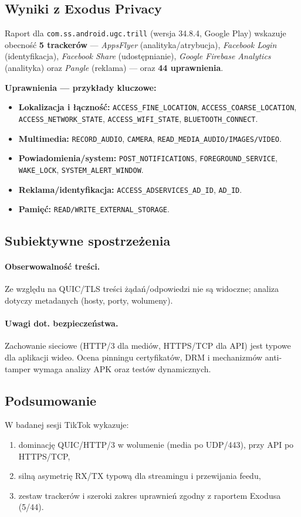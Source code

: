 \subsection{Wyniki z Exodus Privacy \cite{ExodusPrivacy}}
Raport dla \texttt{com.ss.android.ugc.trill} (wersja 34.8.4, Google Play) wskazuje obecność \textbf{5 trackerów} — \emph{AppsFlyer} (analityka/atrybucja), \emph{Facebook Login} (identyfikacja), \emph{Facebook Share} (udostępnianie), \emph{Google Firebase Analytics} (analityka) oraz \emph{Pangle} (reklama) — oraz \textbf{44 uprawnienia}.

\textbf{Uprawnienia — przykłady kluczowe:}
\begin{itemize}
  \item \textbf{Lokalizacja i łączność:} \texttt{ACCESS\_FINE\_LOCATION}, \texttt{ACCESS\_COARSE\_LOCATION}, \texttt{ACCESS\_NETWORK\_STATE}, \texttt{ACCESS\_WIFI\_STATE}, \texttt{BLUETOOTH\_CONNECT}.
  \item \textbf{Multimedia:} \texttt{RECORD\_AUDIO}, \texttt{CAMERA}, \texttt{READ\_MEDIA\_AUDIO/IMAGES/VIDEO}.
  \item \textbf{Powiadomienia/system:} \texttt{POST\_NOTIFICATIONS}, \texttt{FOREGROUND\_SERVICE}, \texttt{WAKE\_LOCK}, \texttt{SYSTEM\_ALERT\_WINDOW}.
  \item \textbf{Reklama/identyfikacja:} \texttt{ACCESS\_ADSERVICES\_AD\_ID}, \texttt{AD\_ID}.
  \item \textbf{Pamięć:} \texttt{READ/WRITE\_EXTERNAL\_STORAGE}.
\end{itemize}

\subsection{Subiektywne spostrzeżenia}
\paragraph{Obserwowalność treści.} 
Ze względu na QUIC/TLS treści żądań/odpowiedzi nie są widoczne; analiza dotyczy metadanych (hosty, porty, wolumeny).

\paragraph{Uwagi dot. bezpieczeństwa.}
Zachowanie sieciowe (HTTP/3 dla mediów, HTTPS/TCP dla API) jest typowe dla aplikacji wideo. Ocena pinningu certyfikatów, DRM i mechanizmów anti-tamper wymaga analizy APK oraz testów dynamicznych.

\subsection{Podsumowanie}
W badanej sesji TikTok wykazuje:
\begin{enumerate}
\item dominację QUIC/HTTP/3 w wolumenie (media po UDP/443), przy API po HTTPS/TCP,
\item silną asymetrię RX/TX typową dla streamingu i przewijania feedu,
\item zestaw trackerów i szeroki zakres uprawnień zgodny z raportem Exodusa (5/44).
\end{enumerate}
